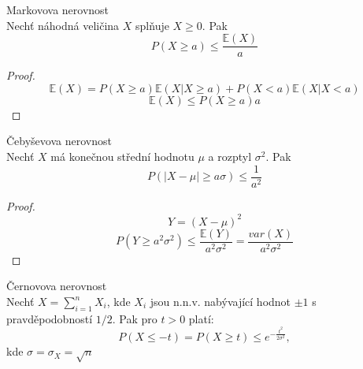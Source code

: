 \documentclass[../main.tex]{subfiles}
\begin{document}
\begin{theorem}
    Markovova nerovnost\\

    Nechť náhodná veličina $X$ splňuje $X\geq 0$. Pak
    \[P(X\geq a) \leq \frac{\mathbb{E}(X)}{a}\]
    \begin{proof}
        \[\mathbb{E}(X) = P(X\geq a)\mathbb{E}(X|X\geq a) + P(X< a) \mathbb{E}(X|X<a)\]
        \[ \mathbb{E}(X) \leq P(X\geq a)a\]
    \end{proof}
\end{theorem}
\begin{theorem}
    Čebyševova nerovnost\\

    Nechť $X$ má konečnou střední hodnotu $\mu$ a rozptyl $\sigma^2$. Pak
    \[P(|X-\mu|\geq a\sigma)\leq \frac{1}{a^2}\]
    \begin{proof}
        \[Y = (X-\mu)^2\]
        \[P(Y\geq a^2\sigma^2) \leq \frac{\mathbb{E}(Y)}{a^2\sigma^2}= \frac{var(X)}{a^2\sigma^2}\]
    \end{proof}
\end{theorem} 
\begin{theorem}
    Černovova nerovnost\\

    Nechť $X = \sum^n_{i=1} X_i$, kde $X_i$ jsou n.n.v. nabývající hodnot $\pm 1$ s pravděpodobností $1/2$. Pak pro $t>0$ platí:
    \[P(X\leq -t) = P(X\geq t) \leq e^{-\frac{t^2}{2\sigma^2}},\]
    kde $\sigma = \sigma_X = \sqrt{n}$ 
\end{theorem}
\end{document}
